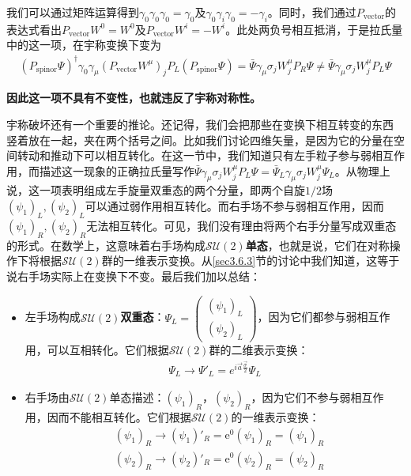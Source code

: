 我们可以通过矩阵运算得到$\gamma_0\gamma_0\gamma_0=\gamma_0$及$\gamma_0\gamma_i\gamma_0=-\gamma_i$。同时，我们通过$P_\text{vector}$的表达式看出$P_\text{vector}W^0 = W^0$及$P_\text{vector}W^i = -W^i$。此处两负号相互抵消，于是拉氏量中的这一项，在宇称变换下变为
\begin{align}
(P_\text{spinor}\Psi)^\dag\gamma_0\gamma_\mu(P_\text{vector}W^\mu)_jP_L(P_\text{spinor}\Psi)=\bar{\Psi}\gamma_\mu\sigma_j W_j^\mu P_R\Psi\ne\bar{\Psi}\gamma_\mu\sigma_j W_j^\mu P_L\Psi
\label{equ7.110}
\end{align}

\textbf{因此这一项不具有不变性，也就违反了宇称对称性。}

宇称破坏还有一个重要的推论。还记得，我们会把那些在变换下相互转变的东西%
%
竖着放在一起，夹在两个括号之间。比如我们讨论四维矢量，是因为它的分量在空间转动和推动下可以相互转化。在这一节中，我们知道只有左手粒子参与弱相互作用，而描述这一现象的正确拉氏量写作$\bar{\Psi}\gamma_\mu\sigma_j W_j^\mu P_L\Psi=\bar{\Psi}_L\gamma_\mu\sigma_j W_j^\mu\Psi_L$。从物理上说，这一项表明组成左手旋量双重态的两个分量，即两个自旋$1/2$场$(\psi_1)_L,(\psi_2)_L$可以通过弱作用相互转化。而右手场不参与弱相互作用，因而$(\psi_1)_R,(\psi_2)_R$无法相互转化。可见，我们没有理由将两个右手分量写成双重态的形式。在数学上，这意味着右手场构成$\mathcal{SU}(2)${\bf 单态}，也就是说，它们在对称操作下将根据$\mathcal{SU}(2)$群的一维表示变换。从\ref{sec3.6.3}节的讨论中我们知道，这等于说右手场实际上在变换下不变。最后我们加以总结：
\begin{itemize}
\item 左手场构成$\mathcal{SU}(2)${\bf 双重态}：$\Psi_L=\begin{pmatrix}(\psi_1)_L\\ (\psi_2)_L\end{pmatrix}$，因为它们都参与弱相互作用，可以互相转化。它们根据$\mathcal{SU}(2)$群的二维表示变换：
\begin{align}
\Psi_L\rightarrow\Psi'_L=e^{i\vec{a}\frac{\vec{\sigma}}{2}}\Psi_L
\label{equ7.111}
\end{align}
\item 右手场由$\mathcal{SU}(2)$单态描述：$(\psi_1)_R$，$(\psi_2)_R$，因为它们不参与弱相互作用，因而不能相互转化。它们根据$\mathcal{SU}(2)$的一维表示变换：
\begin{align}
&(\psi_1)_R\rightarrow (\psi_1)'_R=\mathrm{e}^0(\psi_1)_R=(\psi_1)_R\nonumber\\
&(\psi_2)_R\rightarrow (\psi_2)'_R=\mathrm{e}^0(\psi_2)_R=(\psi_2)_R
\label{equ7.112}
\end{align}
\end{itemize}

